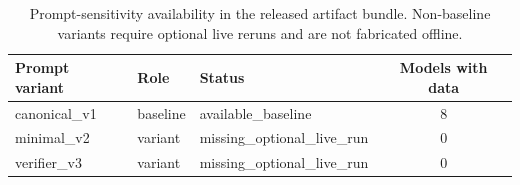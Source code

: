 \begin{table}[t]
\centering
\small
\begin{tabular}{lllc}
\toprule
Prompt variant & Role & Status & Models with data \\
\midrule
canonical\_v1 & baseline & available\_baseline & 8 \\
minimal\_v2 & variant & missing\_optional\_live\_run & 0 \\
verifier\_v3 & variant & missing\_optional\_live\_run & 0 \\
\bottomrule
\end{tabular}
\caption{Prompt-sensitivity availability in the released artifact bundle. Non-baseline variants require optional live reruns and are not fabricated offline.}
\label{tab:prompt_sensitivity_status}
\end{table}
